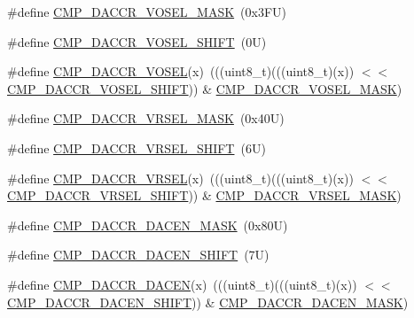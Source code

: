\begin{DoxyCompactItemize}
\item 
\#define \mbox{\hyperlink{group___c_m_p___register___masks_gaf785bdf33cec5e0e8d03022bd7d92022}{C\+M\+P\+\_\+\+D\+A\+C\+C\+R\+\_\+\+V\+O\+S\+E\+L\+\_\+\+M\+A\+SK}}~(0x3\+F\+U)
\item 
\#define \mbox{\hyperlink{group___c_m_p___register___masks_ga329adee42ffc5125d3a6a85c6b990311}{C\+M\+P\+\_\+\+D\+A\+C\+C\+R\+\_\+\+V\+O\+S\+E\+L\+\_\+\+S\+H\+I\+FT}}~(0\+U)
\item 
\#define \mbox{\hyperlink{group___c_m_p___register___masks_gaac950bb0c2d158445dd28d3493708637}{C\+M\+P\+\_\+\+D\+A\+C\+C\+R\+\_\+\+V\+O\+S\+EL}}(x)~(((uint8\+\_\+t)(((uint8\+\_\+t)(x)) $<$$<$ \mbox{\hyperlink{group___c_m_p___register___masks_ga329adee42ffc5125d3a6a85c6b990311}{C\+M\+P\+\_\+\+D\+A\+C\+C\+R\+\_\+\+V\+O\+S\+E\+L\+\_\+\+S\+H\+I\+FT}})) \& \mbox{\hyperlink{group___c_m_p___register___masks_gaf785bdf33cec5e0e8d03022bd7d92022}{C\+M\+P\+\_\+\+D\+A\+C\+C\+R\+\_\+\+V\+O\+S\+E\+L\+\_\+\+M\+A\+SK}})
\item 
\#define \mbox{\hyperlink{group___c_m_p___register___masks_gac9eceaf5b3e478eb1a332681c8bcf160}{C\+M\+P\+\_\+\+D\+A\+C\+C\+R\+\_\+\+V\+R\+S\+E\+L\+\_\+\+M\+A\+SK}}~(0x40\+U)
\item 
\#define \mbox{\hyperlink{group___c_m_p___register___masks_gab9f804a9c4ecafbaaa82f2fc0ec69083}{C\+M\+P\+\_\+\+D\+A\+C\+C\+R\+\_\+\+V\+R\+S\+E\+L\+\_\+\+S\+H\+I\+FT}}~(6\+U)
\item 
\#define \mbox{\hyperlink{group___c_m_p___register___masks_ga27c3cbdda69ab132f0a4ac2408221e37}{C\+M\+P\+\_\+\+D\+A\+C\+C\+R\+\_\+\+V\+R\+S\+EL}}(x)~(((uint8\+\_\+t)(((uint8\+\_\+t)(x)) $<$$<$ \mbox{\hyperlink{group___c_m_p___register___masks_gab9f804a9c4ecafbaaa82f2fc0ec69083}{C\+M\+P\+\_\+\+D\+A\+C\+C\+R\+\_\+\+V\+R\+S\+E\+L\+\_\+\+S\+H\+I\+FT}})) \& \mbox{\hyperlink{group___c_m_p___register___masks_gac9eceaf5b3e478eb1a332681c8bcf160}{C\+M\+P\+\_\+\+D\+A\+C\+C\+R\+\_\+\+V\+R\+S\+E\+L\+\_\+\+M\+A\+SK}})
\item 
\#define \mbox{\hyperlink{group___c_m_p___register___masks_gacfd8aec2de81865d8f5fc0f06d17ba08}{C\+M\+P\+\_\+\+D\+A\+C\+C\+R\+\_\+\+D\+A\+C\+E\+N\+\_\+\+M\+A\+SK}}~(0x80\+U)
\item 
\#define \mbox{\hyperlink{group___c_m_p___register___masks_ga85aa1686a0d5a7de2375bfab7167bb93}{C\+M\+P\+\_\+\+D\+A\+C\+C\+R\+\_\+\+D\+A\+C\+E\+N\+\_\+\+S\+H\+I\+FT}}~(7\+U)
\item 
\#define \mbox{\hyperlink{group___c_m_p___register___masks_ga4d4b6f6bdeaeed839b8f565113dd2717}{C\+M\+P\+\_\+\+D\+A\+C\+C\+R\+\_\+\+D\+A\+C\+EN}}(x)~(((uint8\+\_\+t)(((uint8\+\_\+t)(x)) $<$$<$ \mbox{\hyperlink{group___c_m_p___register___masks_ga85aa1686a0d5a7de2375bfab7167bb93}{C\+M\+P\+\_\+\+D\+A\+C\+C\+R\+\_\+\+D\+A\+C\+E\+N\+\_\+\+S\+H\+I\+FT}})) \& \mbox{\hyperlink{group___c_m_p___register___masks_gacfd8aec2de81865d8f5fc0f06d17ba08}{C\+M\+P\+\_\+\+D\+A\+C\+C\+R\+\_\+\+D\+A\+C\+E\+N\+\_\+\+M\+A\+SK}})
\end{DoxyCompactItemize}
